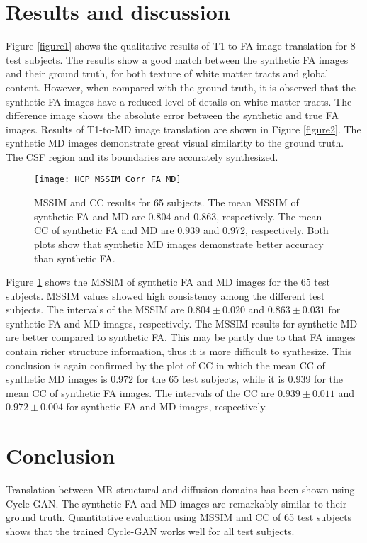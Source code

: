 \documentclass{article}
\begin{document}
\section{Results and discussion}
\label{sec:typestyle}

Figure \ref{figure1} shows the qualitative results of T1-to-FA image translation for 8 test subjects. The results show a good match between the synthetic FA images and their ground truth, for both texture of white matter tracts and global content.
However, when compared with the ground truth, it is observed that the synthetic FA images have a reduced level of  details on white matter tracts. The difference image shows the absolute error between the synthetic and true FA images.
Results of T1-to-MD image translation are shown in Figure \ref{figure2}. The synthetic MD images demonstrate great visual similarity to the ground truth. The CSF region and its boundaries are accurately synthesized.

\begin{figure}[H]
\begin{minipage}[b]{1.0\linewidth}
  \centering
  \centerline{\texttt{[image: HCP\_MSSIM\_Corr\_FA\_MD]}}
\end{minipage}
\caption{MSSIM and CC results for 65 subjects. The mean MSSIM of synthetic FA and MD are 0.804 and 0.863, respectively. The mean CC of synthetic FA and MD are 0.939 and 0.972, respectively. Both plots show that synthetic MD images demonstrate better accuracy than synthetic FA.}
\label{figure3}
\end{figure}

Figure \ref{figure3} shows the MSSIM of synthetic FA and MD images for the 65 test subjects. MSSIM values showed high consistency among the different test subjects. The intervals of the MSSIM are $0.804 \pm 0.020$ and $0.863 \pm 0.031$ for synthetic FA and MD images, respectively. The MSSIM results for synthetic MD are better compared to synthetic FA. This may be partly due to that FA images contain richer structure information, thus it is more difficult to synthesize. This conclusion is again confirmed by the plot of CC in which the mean CC of synthetic MD images is 0.972 for the 65 test subjects, while it is 0.939 for the mean CC of synthetic FA images. The intervals of the CC are $0.939 \pm 0.011$ and $0.972 \pm 0.004$ for synthetic FA and MD images, respectively.

\section{Conclusion}
Translation between MR structural and diffusion domains has been shown using Cycle-GAN. The synthetic FA and MD images
are remarkably similar to their ground truth.
Quantitative evaluation using MSSIM and CC of 65 test subjects shows
that
the trained Cycle-GAN works well for all test subjects.
\end{document}
